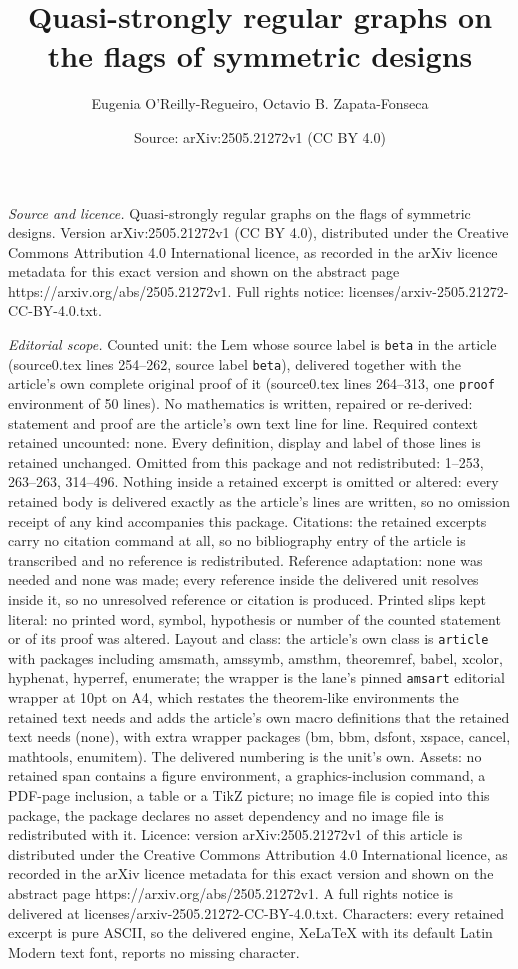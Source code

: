 \documentclass[10pt,a4paper]{amsart}
\title[Quasi-strongly regular graphs on the flags of symmetric desi]{Quasi-strongly regular graphs on the flags of symmetric designs}
\author{Eugenia O'Reilly-Regueiro, Octavio B. Zapata-Fonseca}
\date{Source: arXiv:2505.21272v1 (CC BY 4.0)}
\begin{document}
\maketitle

\noindent\emph{Source and licence.} Quasi-strongly regular graphs on the flags of symmetric designs. Version arXiv:2505.21272v1 (CC BY 4.0), distributed under the Creative Commons Attribution 4.0 International licence, as recorded in the arXiv licence metadata for this exact version and shown on the abstract page https://arxiv.org/abs/2505.21272v1. Full rights notice: licenses/arxiv-2505.21272-CC-BY-4.0.txt.\par\smallskip

\noindent\textit{Editorial scope.} Counted unit: the Lem whose source label is \texttt{beta} in the article (source0.tex lines 254--262, source label \texttt{beta}), delivered together with the article's own complete original proof of it (source0.tex lines 264--313, one \texttt{proof} environment of 50 lines). No mathematics is written, repaired or re-derived: statement and proof are the article's own text line for line. Required context retained uncounted: none. Every definition, display and label of those lines is retained unchanged. Omitted from this package and not redistributed: 1--253, 263--263, 314--496. Nothing inside a retained excerpt is omitted or altered: every retained body is delivered exactly as the article's lines are written, so no omission receipt of any kind accompanies this package. Citations: the retained excerpts carry no citation command at all, so no bibliography entry of the article is transcribed and no reference is redistributed. Reference adaptation: none was needed and none was made; every reference inside the delivered unit resolves inside it, so no unresolved reference or citation is produced. Printed slips kept literal: no printed word, symbol, hypothesis or number of the counted statement or of its proof was altered. Layout and class: the article's own class is \texttt{article} with packages including amsmath, amssymb, amsthm, theoremref, babel, xcolor, hyphenat, hyperref, enumerate; the wrapper is the lane's pinned \texttt{amsart} editorial wrapper at 10pt on A4, which restates the theorem-like environments the retained text needs and adds the article's own macro definitions that the retained text needs (none), with extra wrapper packages (bm, bbm, dsfont, xspace, cancel, mathtools, enumitem). The delivered numbering is the unit's own. Assets: no retained span contains a figure environment, a graphics-inclusion command, a PDF-page inclusion, a table or a TikZ picture; no image file is copied into this package, the package declares no asset dependency and no image file is redistributed with it. Licence: version arXiv:2505.21272v1 of this article is distributed under the Creative Commons Attribution 4.0 International licence, as recorded in the arXiv licence metadata for this exact version and shown on the abstract page https://arxiv.org/abs/2505.21272v1. A full rights notice is delivered at licenses/arxiv-2505.21272-CC-BY-4.0.txt. Characters: every retained excerpt is pure ASCII, so the delivered engine, XeLaTeX with its default Latin Modern text font, reports no missing character.
\end{document}
